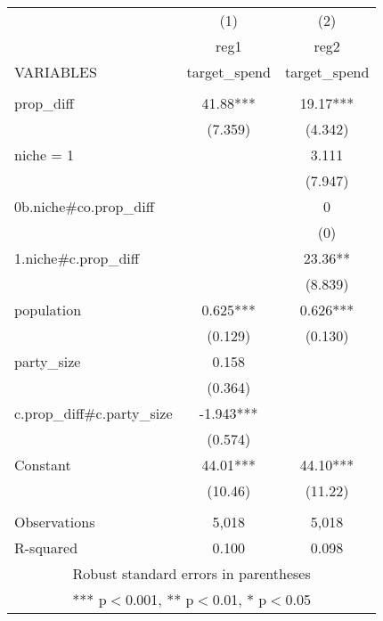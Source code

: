 \documentclass[]{article}
\begin{document}
\begin{tabular}{lcc} \hline
 & (1) & (2) \\
 & reg1 & reg2 \\
VARIABLES & target\_spend & target\_spend \\ \hline
 &  &  \\
prop\_diff & 41.88*** & 19.17*** \\
 & (7.359) & (4.342) \\
niche = 1 &  & 3.111 \\
 &  & (7.947) \\
0b.niche\#co.prop\_diff &  & 0 \\
 &  & (0) \\
1.niche\#c.prop\_diff &  & 23.36** \\
 &  & (8.839) \\
population & 0.625*** & 0.626*** \\
 & (0.129) & (0.130) \\
party\_size & 0.158 &  \\
 & (0.364) &  \\
c.prop\_diff\#c.party\_size & -1.943*** &  \\
 & (0.574) &  \\
Constant & 44.01*** & 44.10*** \\
 & (10.46) & (11.22) \\
 &  &  \\
Observations & 5,018 & 5,018 \\
 R-squared & 0.100 & 0.098 \\ \hline
\multicolumn{3}{c}{ Robust standard errors in parentheses} \\
\multicolumn{3}{c}{ *** p$<$0.001, ** p$<$0.01, * p$<$0.05} \\
\end{tabular}
\end{document}
